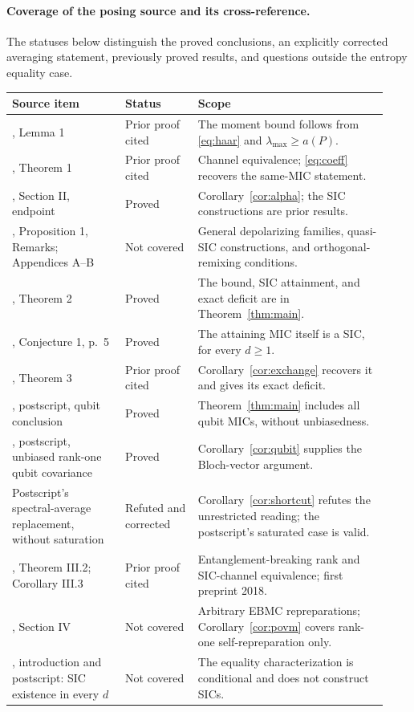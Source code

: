 \documentclass[11pt]{article}
\begin{document}
\paragraph{Coverage of the posing source and its cross-reference.}
The statuses below distinguish the proved conclusions, an explicitly
corrected averaging statement, previously proved results, and questions
outside the entropy equality case.
{\small
\begin{longtable}{@{}p{0.28\linewidth}p{0.18\linewidth}p{0.47\linewidth}@{}}
\toprule
Source item & Status & Scope \\
\midrule
\endhead
\cite{DS}, Lemma 1 & Prior proof cited & The moment bound follows from \eqref{eq:haar} and $\lambda_{\max}\geq a(P)$. \\
\cite{DS}, Theorem 1 & Prior proof cited & Channel equivalence; \eqref{eq:coeff} recovers the same-MIC statement. \\
\cite{DS}, Section II, endpoint & Proved & Corollary~\ref{cor:alpha}; the SIC constructions are prior results. \\
\cite{DS}, Proposition 1, Remarks; Appendices A--B & Not covered & General depolarizing families, quasi-SIC constructions, and orthogonal-remixing conditions. \\
\cite{DS}, Theorem 2 & Proved & The bound, SIC attainment, and exact deficit are in Theorem~\ref{thm:main}. \\
\cite{DS}, Conjecture 1, p.~5 & Proved & The attaining MIC itself is a SIC, for every $d\geq1$. \\
\cite{DS}, Theorem 3 & Prior proof cited & Corollary~\ref{cor:exchange} recovers it and gives its exact deficit. \\
\cite{DS}, postscript, qubit conclusion & Proved & Theorem~\ref{thm:main} includes all qubit MICs, without unbiasedness. \\
\cite{DS}, postscript, unbiased rank-one qubit covariance & Proved & Corollary~\ref{cor:qubit} supplies the Bloch-vector argument. \\
Postscript's spectral-average replacement, without saturation & Refuted and corrected & Corollary~\ref{cor:shortcut} refutes the unrestricted reading; the postscript's saturated case is valid. \\
\cite{PPPR}, Theorem III.2; Corollary III.3 & Prior proof cited & Entanglement-breaking rank and SIC-channel equivalence; first preprint 2018. \\
\cite{DS}, Section IV & Not covered & Arbitrary EBMC repreparations; Corollary~\ref{cor:povm} covers rank-one self-repreparation only. \\
\cite{DS}, introduction and postscript: SIC existence in every $d$ & Not covered & The equality characterization is conditional and does not construct SICs. \\
\bottomrule
\end{longtable}}
\end{document}
